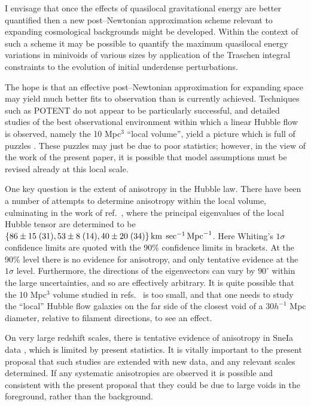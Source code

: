 \documentclass[12pt]{article}
\begin{document}
I envisage that once the effects of quasilocal gravitational energy are
better quantified then a new post--Newtonian approximation scheme relevant
to expanding cosmological backgrounds might be developed. Within the context
of such a scheme it may be possible to quantify the maximum quasilocal
energy variations in minivoids of various sizes by application of the
Traschen integral constraints \cite{Traschen1} to the evolution of initial
underdense perturbations.

The hope is that an effective post--Newtonian approximation for expanding
space may yield much better fits to observation than is currently achieved.
Techniques such as POTENT do not appear to be particularly successful, and
detailed studies of the best observational environment within which a
linear Hubble flow is observed, namely the 10 Mpc$^3$ ``local volume'',
yield a picture which is full of puzzles \cite{Whiting1,Whiting2}. These
puzzles may just be due to poor statistics; however, in the view of the
work of the present paper, it is possible that model assumptions must
be revised already at this local scale.

One key question is the extent of anisotropy in the Hubble law.
There have been a number of attempts to determine anisotropy within the
local volume, culminating in the work of ref.\ \cite{Whiting2}, where the
principal eigenvalues of the local Hubble tensor are determined to be
$\{86\pm15\;(31),53\pm8\;(14),40\pm20\; (34)\}\,\hbox{km}\;\,\hbox{sec}^{-1}\,\hbox{Mpc}^{-1}$. Here Whiting's
$1\sigma$ confidence limits are quoted with the 90\% confidence limits in
brackets. At the 90\% level there is no evidence for anisotropy, and only
tentative evidence at the $1\sigma$ level. Furthermore, the directions of the
eigenvectors can vary by $90^\circ$ within the large uncertainties, and
so are effectively arbitrary. It is quite possible that the 10 Mpc$^3$
volume studied in refs.\ \cite{Whiting1,Whiting2} is too small, and that
one needs to study the ``local'' Hubble flow galaxies on the far side of
the closest void of a $30h^{-1}$ Mpc diameter, relative to filament
directions, to see an effect.

On very large redshift scales, there is tentative evidence of anisotropy
in SneIa data \cite{Bochner}, which is limited by present statistics.
It is vitally important to the present proposal that such studies are
extended with new data, and any relevant scales determined. If any
systematic anisotropies are observed it is possible and consistent
with the present proposal that they could be due to large voids
in the foreground, rather than the background.
\end{document}
